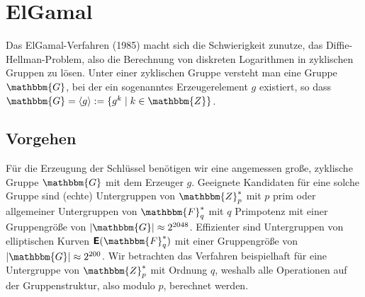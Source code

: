 \section{ElGamal}
\label{ch:asymenc:elgamal}
Das ElGamal-Verfahren (1985) macht sich die Schwierigkeit zunutze, das Diffie-Hellman-Problem, also die Berechnung von diskreten Logarithmen in zyklischen Gruppen zu lösen. Unter einer zyklischen Gruppe versteht man eine Gruppe $\mathbbm{G}$, bei der ein sogenanntes Erzeugerelement $g$ existiert, so dass $\mathbbm{G} = \langle g \rangle := \{g^k \mid k \in \mathbbm{Z}\}$.

\subsection{Vorgehen}
Für die Erzeugung der Schlüssel benötigen wir eine angemessen große, zyklische Gruppe $\mathbbm{G}$ mit dem Erzeuger $g$.
Geeignete Kandidaten für eine solche Gruppe sind (echte) Untergruppen von $\mathbbm{Z}^*_p$ mit $p$ prim oder allgemeiner Untergruppen von $\mathbbm{F}^*_q$ mit $q$ Primpotenz mit einer Gruppengröße von $|\mathbbm{G}| \approx 2^{2048}$. Effizienter sind Untergruppen von elliptischen Kurven
$\boldsymbol{\mathsf{E}}(\mathbbm{F}^*_q)$ mit einer Gruppengröße von $|\mathbbm{G}| \approx 2^{200}$. Wir betrachten das Verfahren beispielhaft für eine Untergruppe von $\mathbbm{Z}^*_p$ mit Ordnung $q$, weshalb alle Operationen auf der Gruppenstruktur, also modulo $p$, berechnet werden.

